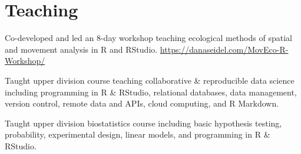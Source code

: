 \documentclass[]{deedy-resume-openfont}
\begin{document}
\begin{minipage}[t]{0.66\textwidth}
\sectionsep


\section{Teaching}
 
 Co-developed and led an 8-day workshop teaching ecological methods of spatial and movement analysis in R and RStudio. \url{https://danaseidel.com/MovEco-R-Workshop/}
\vspace{4pt}

 
 Taught upper division course teaching collaborative \& reproducible data science including programming in R \& RStudio, relational databases, data management, version control, remote data and APIs, cloud computing, and R Markdown.
\vspace{4pt}

	 
Taught upper division biostatistics course including basic hypothesis testing, probability, experimental design, linear models, and programming in R \& RStudio.
\end{minipage} 
\end{document}
